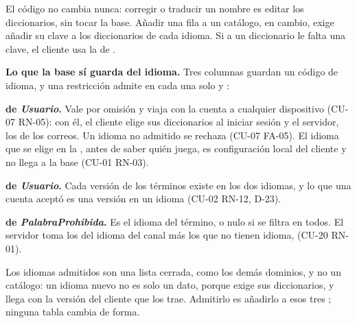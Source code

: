 El código no cambia nunca: corregir o traducir un nombre es editar los diccionarios, sin tocar la base. Añadir una fila a un catálogo, en cambio, exige añadir su clave a los diccionarios de cada idioma. Si a un diccionario le falta una clave, el cliente usa la de .

\textbf{Lo que la base sí guarda del idioma.} Tres columnas guardan un código de idioma, y una restricción  admite en cada una solo  y :

\begin{reglas}
  \item \textbf{ de \textit{Usuario}.} Vale  por omisión y viaja con la cuenta a cualquier dispositivo (\mbox{CU-07} \mbox{RN-05}): con él, el cliente elige sus diccionarios al iniciar sesión y el servidor, los de los correos. Un idioma no admitido se rechaza (\mbox{CU-07} \mbox{FA-05}). El idioma que se elige en la , antes de saber quién juega, es configuración local del cliente y no llega a la base (\mbox{CU-01} \mbox{RN-03}).
  \item \textbf{ de \textit{Usuario}.} Cada versión de los términos existe en los dos idiomas, y lo que una cuenta aceptó es una versión en un idioma (\mbox{CU-02} \mbox{RN-12}, \mbox{D-23}).
  \item \textbf{ de \textit{PalabraProhibida}.} Es el idioma del término, o nulo si se filtra en todos. El servidor toma los del idioma del canal más los que no tienen idioma,  (\mbox{CU-20} \mbox{RN-01}).
\end{reglas}

Los idiomas admitidos son una lista cerrada, como los demás dominios, y no un catálogo: un idioma nuevo no es solo un dato, porque exige sus diccionarios, y llega con la versión del cliente que los trae. Admitirlo es añadirlo a esos tres ; ninguna tabla cambia de forma.
